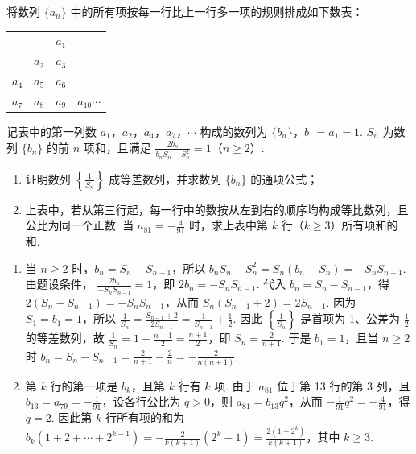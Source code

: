 \begin{problem}
将数列 \(\{a_n\}\) 中的所有项按每一行比上一行多一项的规则排成如下数表：

\begin{center}
\begin{tabular}{cccc}
 &  & \(a_1\) &  \\
 & \(a_2\) & \(a_3\) &  \\
\(a_4\) & \(a_5\) & \(a_6\) &  \\
\(a_7\) & \(a_8\) & \(a_9\) & \(a_{10} \cdots\)
\end{tabular}
\end{center}

记表中的第一列数 \(a_1\)，\(a_2\)，\(a_4\)，\(a_7\)，\(\cdots\) 构成的数列为 \(\{b_n\}\)，\(b_1 = a_1 = 1\). \(S_n\) 为数列 \(\{b_n\}\) 的前 \(n\) 项和，且满足 \(\frac{2b_n}{b_nS_n - S_n^2} = 1\)（\(n \geqslant 2\)）.
\begin{enumerate}
\item 证明数列 \(\left\{\frac{1}{S_n}\right\}\) 成等差数列，并求数列 \(\{b_n\}\) 的通项公式；
\item 上表中，若从第三行起，每一行中的数按从左到右的顺序均构成等比数列，且公比为同一个正数. 当 \(a_{81} = -\frac{4}{91}\) 时，求上表中第 \(k\) 行（\(k \geqslant 3\)）所有项和的和.
\end{enumerate}
\end{problem}

\begin{solution}
\begin{enumerate}
\item 当 \(n\geqslant2\) 时，\(b_n=S_n-S_{n-1}\)，所以
\(b_nS_n-S_n^2=S_n(b_n-S_n)=-S_nS_{n-1}\). 由题设条件，
\(\frac{2b_n}{-S_nS_{n-1}}=1\)，即 \(2b_n=-S_nS_{n-1}\). 代入 \(b_n=S_n-S_{n-1}\)，得
\(2(S_n-S_{n-1})=-S_nS_{n-1}\)，从而 \(S_n(S_{n-1}+2)=2S_{n-1}\). 因为 \(S_1=b_1=1\)，所以
\(\frac1{S_n}=\frac{S_{n-1}+2}{2S_{n-1}}=\frac1{S_{n-1}}+\frac12\). 因此 \(\left\{\frac1{S_n}\right\}\) 是首项为 1、公差为 \(\frac12\) 的等差数列，故
\(\frac1{S_n}=1+\frac{n-1}{2}=\frac{n+1}{2}\)，即 \(S_n=\frac2{n+1}\). 于是
\(b_1=1\)，且当 \(n\geqslant2\) 时
\(b_n=S_n-S_{n-1}=\frac2{n+1}-\frac2n=-\frac2{n(n+1)}\).

\item 第 \(k\) 行的第一项是 \(b_k\)，且第 \(k\) 行有 \(k\) 项. 由于 \(a_{81}\) 位于第 13 行的第 3 列，且 \(b_{13}=a_{79}=-\frac1{91}\)，设各行公比为 \(q>0\)，则
\(a_{81}=b_{13}q^2\)，从而 \(-\frac1{91}q^2=-\frac4{91}\)，得 \(q=2\). 因此第 \(k\) 行所有项的和为
\(b_k(1+2+\cdots+2^{k-1})=-\frac2{k(k+1)}(2^k-1)=\frac{2(1-2^k)}{k(k+1)}\)，其中 \(k\geqslant3\).
\end{enumerate}
\end{solution}

